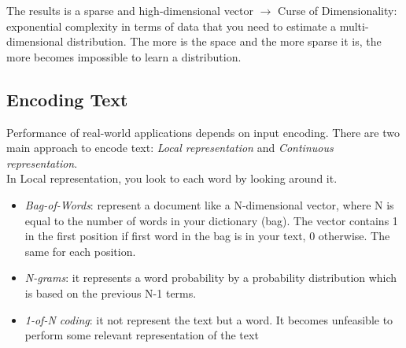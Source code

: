 The results is a sparse and high-dimensional vector $\rightarrow$ Curse of Dimensionality:\\ 
exponential complexity in terms of data that you need to estimate a multi-dimensional distribution. The more is the space and the more sparse it is, the more becomes impossible to learn a distribution.




\subsection{Encoding Text}
Performance of real-world applications depends on input encoding. There are two main approach to encode text: \textit{Local representation} and \textit{Continuous representation}. \\
In Local representation, you look to each word by looking around it. 
\begin{itemize}
    \item \textit{Bag-of-Words}: represent a document like a N-dimensional vector, where N is equal to the number of words in your dictionary (bag). The vector contains 1 in the first position if first word in the bag is in your text, 0 otherwise. The same for each position. 
    \item \textit{N-grams}: it represents a word probability by a probability distribution which is based on the previous N-1 terms. 
    \item \textit{1-of-N coding}: it not represent the text but a word. It becomes unfeasible to perform some relevant representation of the text
\end{itemize}{}

